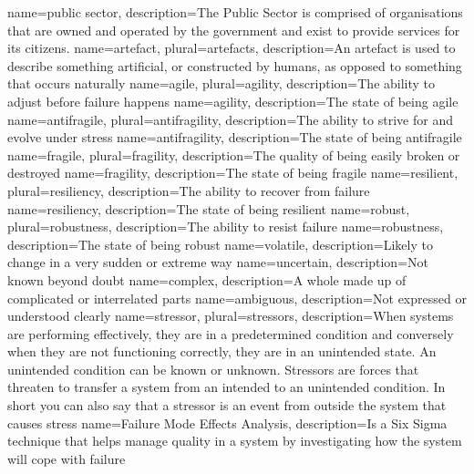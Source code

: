 {
	name={public sector},
	description={The Public Sector is comprised of organisations that are owned and operated by the government and exist to provide services for its citizens.}
}
{
	name={artefact},
	plural={artefacts},
	description={An artefact is used to describe something artificial, or constructed by humans, as opposed to something that occurs naturally}
}
{
	name=agile,
	plural={agility},
	description={The ability to adjust before failure happens}
}
{
	name={agility},
	description={The state of being agile}
}
{
	name=antifragile,
	plural={antifragility},
	description={The ability to strive for and evolve under stress}
}
{
	name={antifragility},
	description={The state of being antifragile}
}
{
	name=fragile,
	plural={fragility},
	description={The quality of being easily broken or destroyed}
}
{
	name={fragility},
	description={The state of being fragile}
}
{
	name=resilient,
	plural={resiliency},
	description={The ability to recover from failure}
}
{
	name={resiliency},
	description={The state of being resilient}
}
{
	name=robust,
	plural={robustness},
	description={The ability to resist failure}
}
{
	name={robustness},
	description={The state of being robust}
}
{
	name=volatile,
	description={Likely to change in a very sudden or extreme way}
}
{
	name=uncertain,
	description={Not known beyond doubt}
}
{
	name=complex,
	description={A whole made up of complicated or interrelated parts}
}
{
	name=ambiguous,
	description={Not expressed or understood clearly}
}
{
	name={stressor},
	plural={stressors},
	description={When systems are performing effectively, they are in a predetermined condition and conversely when they are not functioning correctly, they are in an unintended state. An unintended condition can be known or unknown. Stressors are forces that threaten to transfer a system from an intended to an unintended condition. In short you can also say that a stressor is an event from outside the system that causes stress}
}
{
	name={Failure Mode Effects Analysis},
	description={Is a Six Sigma technique that helps manage quality in a system by investigating how the system will cope with failure}
}
